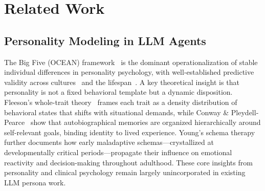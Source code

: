 \documentclass{article}
\newcommand{\todoc}[2]{{\textcolor{#1}{\textbf{[#2]}}}}
\newcommand{\todoblue}[1]{\todoc{blue}{\textbf{#1}}}
\newcommand{\todoorange}[1]{\todoc{orange}{\textbf{#1}}}
\newcommand{\peng}[1]{\todoblue{peng: #1}}
\newcommand{\shi}[1]{\todoorange{shi: #1}}
\begin{document}
\section{Related Work}


\subsection{Personality Modeling in LLM Agents}
The Big Five (OCEAN) framework~\cite{mccrae1992introduction} is the dominant operationalization of stable individual differences in personality psychology, with well-established predictive validity across cultures~\cite{mccrae1997personality} and the lifespan~\cite{roberts2007power}. A key theoretical insight is that personality is not a fixed behavioral template but a dynamic disposition. Fleeson's whole-trait theory~\cite{fleeson2001toward} frames each trait as a density distribution of behavioral states that shifts with situational demands, while Conway \& Pleydell-Pearce~\cite{conway2000construction} show that autobiographical memories are organized hierarchically around self-relevant goals, binding identity to lived experience. Young's schema therapy~\cite{young2006schema} further documents how early maladaptive schemas—crystallized at developmentally critical periods—propagate their influence on emotional reactivity and decision-making throughout adulthood. These core insights from personality and clinical psychology remain largely unincorporated in existing LLM persona work.
\end{document}
